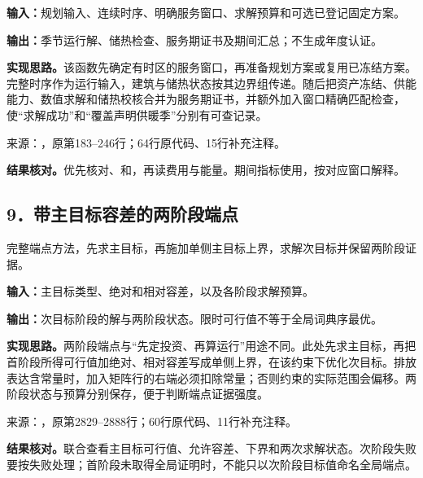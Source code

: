 \noindent\textbf{输入：}规划输入、连续时序、明确服务窗口、求解预算和可选已登记固定方案。\par
\noindent\textbf{输出：}季节运行解、储热检查、服务期证书及期间汇总；不生成年度认证。\par

\noindent\textbf{实现思路。}该函数先确定有时区的服务窗口，再准备规划方案或复用已冻结方案。完整时序作为运行输入，建筑与储热状态按其边界组传递。随后把资产冻结、供能能力、数值求解和储热校核合并为服务期证书，并额外加入窗口精确匹配检查，使“求解成功”和“覆盖声明供暖季”分别有可查记录。

{\small 来源：，原第183--246行；64行原代码、15行补充注释。}\par

\begingroup
{}

\endgroup

\noindent\textbf{结果核对。}优先核对、和，再读费用与能量。期间指标使用，按对应窗口解释。

\subsection*{9．带主目标容差的两阶段端点}
完整端点方法，先求主目标，再施加单侧主目标上界，求解次目标并保留两阶段证据。

\noindent\textbf{输入：}主目标类型、绝对和相对容差，以及各阶段求解预算。\par
\noindent\textbf{输出：}次目标阶段的解与两阶段状态。限时可行值不等于全局词典序最优。\par

\noindent\textbf{实现思路。}两阶段端点与“先定投资、再算运行”用途不同。此处先求主目标，再把首阶段所得可行值加绝对、相对容差写成单侧上界，在该约束下优化次目标。排放表达含常量时，加入矩阵行的右端必须扣除常量；否则约束的实际范围会偏移。两阶段状态与预算分别保存，便于判断端点证据强度。

{\small 来源：，原第2829--2888行；60行原代码、11行补充注释。}\par

\begingroup
{}

\endgroup

\noindent\textbf{结果核对。}联合查看主目标可行值、允许容差、下界和两次求解状态。次阶段失败要按失败处理；首阶段未取得全局证明时，不能只以次阶段目标值命名全局端点。

